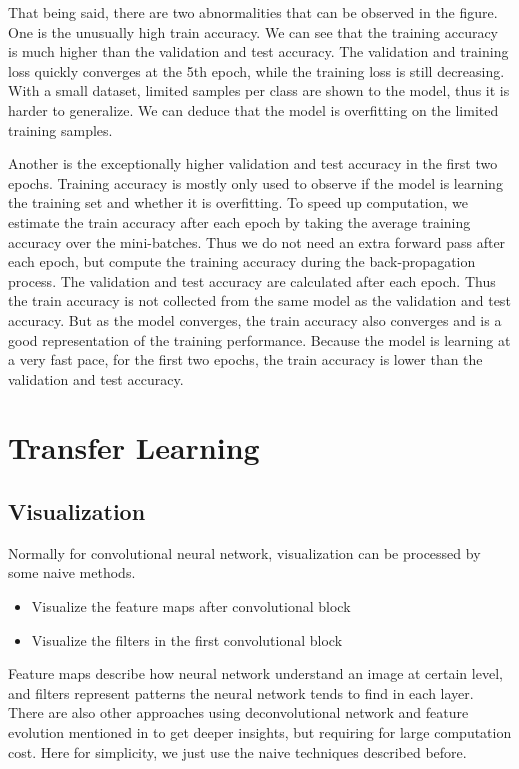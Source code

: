 That being said, there are two abnormalities that can be observed in the figure. One is the unusually high train accuracy. We can see that the training accuracy is much higher than the validation and test accuracy. The validation and training loss quickly converges at the 5th epoch, while the training loss is still decreasing. With a small dataset, limited samples per class are shown to the model, thus it is harder to generalize. We can deduce that the model is overfitting on the limited training samples.

Another is the exceptionally higher validation and test accuracy in the first two epochs. Training accuracy is mostly only used to observe if the model is learning the training set and whether it is overfitting. To speed up computation, we estimate the train accuracy after each epoch by taking the average training accuracy over the mini-batches. Thus we do not need an extra forward pass after each epoch, but compute the training accuracy during the back-propagation process. The validation and test accuracy are calculated after each epoch. Thus the train accuracy is not collected from the same model as the validation and test accuracy. But as the model converges, the train accuracy also converges and is a good representation of the training performance. Because the model is learning at a very fast pace, for the first two epochs, the train accuracy is lower than the validation and test accuracy.

\section{Transfer Learning}
\subsection{Visualization}
Normally for convolutional neural network, visualization can be processed by some naive methods.
\begin{itemize}
\item Visualize the feature maps after convolutional block
\item Visualize the filters in the first convolutional block
\end{itemize}

Feature maps describe how neural network understand an image at certain level, and filters represent patterns the neural network tends to find in each layer. There are also other approaches using deconvolutional network and feature evolution mentioned in \cite{zeiler} to get deeper insights, but requiring for large computation cost. Here for simplicity, we just use the naive techniques described before.


